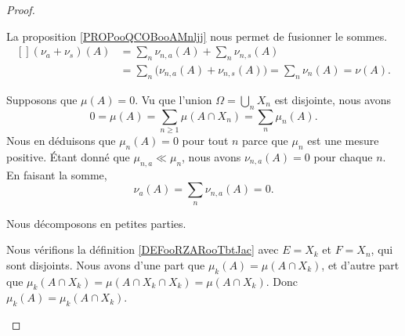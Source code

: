 \begin{proof}
\begin{subproof}
		\spitem[\( \nu=\nu_a+\nu_s\)]

		La proposition \ref{PROPooQCOBooAMnljj} nous permet de fusionner le sommes.
		\begin{equation}
			\begin{aligned}[]
				(\nu_a+\nu_s)(A) & =\sum_n\nu_{n,a}(A)+\sum_n\nu_{n,s}(A)                              \\
				                 & =\sum_n\Big( \nu_{n,a}(A)+\nu_{n,s}(A) \Big)=\sum_n\nu_n(A)=\nu(A).
			\end{aligned}
		\end{equation}

		\spitem[\( \nu_a\ll\mu\)]

		Supposons que \( \mu(A)=0\). Vu que l'union \( \Omega=\bigcup_nX_n\) est disjointe, nous avons
		\begin{equation}
			0=\mu(A)=\sum_{n\geq 1}\mu(A\cap X_n)=\sum_n\mu_n(A).
		\end{equation}
		Nous en déduisons que \( \mu_n(A)=0\) pour tout \( n\) parce que \( \mu_n\) est une mesure positive. Étant donné que \( \mu_{n,a}\ll \mu_n\), nous avons \( \nu_{n,a}(A)=0\) pour chaque \( n\). En faisant la somme,
		\begin{equation}
			\nu_a(A)=\sum_n\nu_{n,a}(A)=0.
		\end{equation}

		\spitem[\( \nu_s\perp \mu\)]
		Nous décomposons en petites parties.
		\begin{subproof}
			Nous vérifions la définition \ref{DEFooRZARooTbtJac} avec \( E=X_k\) et \( F=X_n\), qui sont disjoints. Nous avons d'une part que \( \mu_k(A)=\mu(A\cap X_k)\), et d'autre part que \( \mu_k(A\cap X_k)=\mu(A\cap X_k\cap X_k)=\mu(A\cap X_k)\). Donc \( \mu_k(A)=\mu_k(A\cap X_k)\).


\end{subproof}
\end{subproof}
\end{proof}

